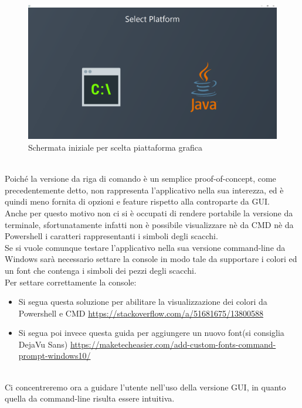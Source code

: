 \documentclass[a4paper,12pt]{report}
\begin{document}
\begin{figure}[H]
    \begin{center}
        \centering
        \includegraphics[scale=0.3]{img/guidaUtente/avvioJhaturanga.png}
    \end{center}
    \caption{Schermata iniziale per scelta piattaforma grafica}
    \label{img:avvioJhaturanga}
\end{figure}

%
\
\\
Poiché la versione da riga di comando è un semplice proof-of-concept, come precedentemente detto, non rappresenta l'applicativo nella sua interezza, ed è quindi meno fornita di opzioni e feature rispetto alla controparte da GUI.
\\
Anche per questo motivo non ci si è occupati di rendere portabile la versione da terminale, sfortunatamente infatti non è possibile visualizzare nè da CMD nè da Powershell i caratteri rappresentanti i simboli degli scacchi.
\\
Se si vuole comunque testare l'applicativo nella sua versione command-line da Windows sarà necessario settare la console in modo tale da supportare i colori ed un font che contenga i simboli dei pezzi degli scacchi.
\\
Per settare correttamente la console:

\begin{itemize}
    \item Si segua questa soluzione per abilitare la visualizzazione dei colori da Powershell e CMD \url{https://stackoverflow.com/a/51681675/13800588}
    \item Si segua poi invece questa guida per aggiungere un nuovo font(si consiglia DejaVu Sans)
    \url{https://maketecheasier.com/add-custom-fonts-command-prompt-windows10/}
\end{itemize}
\
\\
Ci concentreremo ora a guidare l'utente nell'uso della versione GUI, in quanto quella da command-line risulta essere intuitiva.
\end{document}
